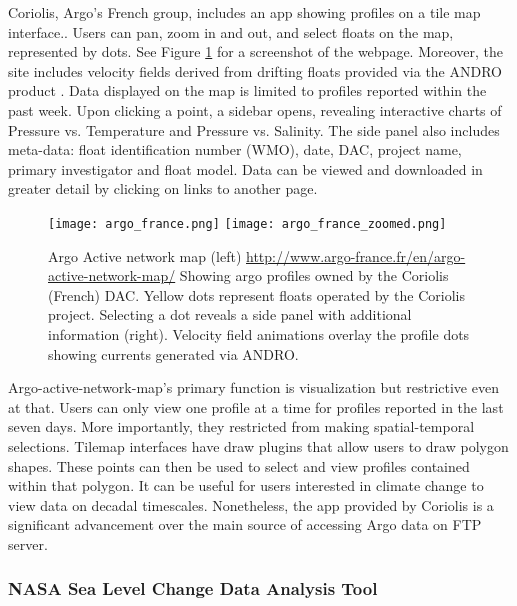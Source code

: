 Coriolis, Argo's French group, includes an app showing profiles on a tile map interface.\cite{argo_fr}. Users can pan, zoom in and out, and select floats on the map, represented by dots. See Figure \ref{fig:argo_france} for a screenshot of the webpage. Moreover, the site includes velocity fields derived from drifting floats provided via the ANDRO product \cite{ANDRO}. Data displayed on the map is limited to profiles reported within the past week. Upon clicking a point, a sidebar opens, revealing interactive charts of Pressure vs. Temperature and Pressure vs. Salinity. The side panel also includes meta-data: float identification number (WMO), date, DAC, project name, primary investigator and float model. Data can be viewed and downloaded in greater detail by clicking on links to another page.

\begin{figure}
\begin{minipage}{6in}
\texttt{[image: argo\_france.png]}
\texttt{[image: argo\_france\_zoomed.png]}
\caption{\label{fig:argo_france}Argo Active network map (left) \url{http://www.argo-france.fr/en/argo-active-network-map/}\cite{argo_fr} Showing argo profiles owned by the Coriolis (French) DAC. Yellow dots represent floats operated by the Coriolis project. Selecting a dot reveals a side panel with additional information (right). Velocity field animations overlay the profile dots showing currents generated via ANDRO.}
\end{minipage}
\end{figure}

Argo-active-network-map's primary function is visualization but restrictive even at that. Users can only view one profile at a time for profiles reported in the last seven days. More importantly, they restricted from making spatial-temporal selections. Tilemap interfaces have draw plugins that allow users to draw polygon shapes. These points can then be used to select and view profiles contained within that polygon. It can be useful for users interested in climate change to view data on decadal timescales. Nonetheless, the app provided by Coriolis is a significant advancement over the main source of accessing Argo data on FTP server.

\subsubsection{NASA Sea Level Change Data Analysis Tool} \label{dat}

